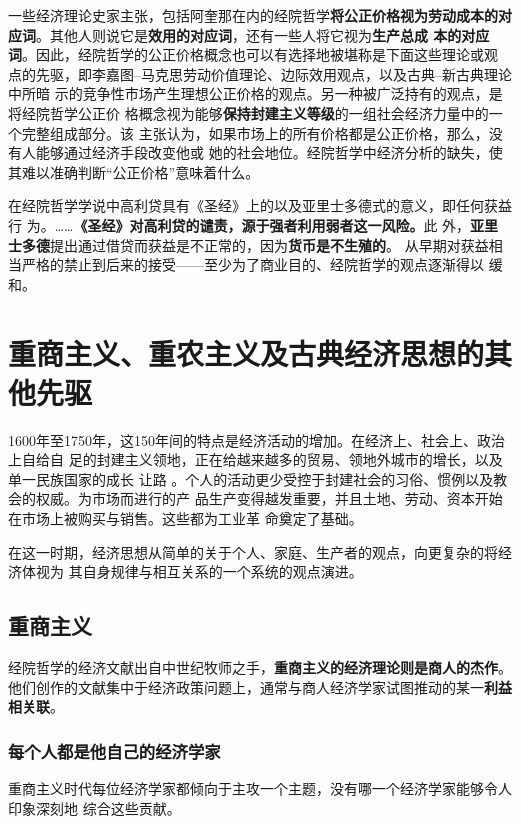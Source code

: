 一些经济理论史家主张，包括阿奎那在内的经院哲学\textbf{将公正价格视为劳动成本的对
  应词}。其他人则说它是\textbf{效用的对应词}，还有一些人将它视为\textbf{生产总成
  本的对应词}。因此，经院哲学的公正价格概念也可以有选择地被堪称是下面这些理论或观
点的先驱，即李嘉图--马克思劳动价值理论、边际效用观点，以及古典--新古典理论中所暗
示的竞争性市场产生理想公正价格的观点。另一种被广泛持有的观点，是将经院哲学公正价
格概念视为能够\textbf{保持封建主义等级}的一组社会经济力量中的一个完整组成部分。该
主张认为，如果市场上的所有价格都是公正价格，那么，没有人能够通过经济手段改变他或
她的社会地位。经院哲学中经济分析的缺失，使其难以准确判断“公正价格”意味着什么。

在经院哲学学说中高利贷具有《圣经》上的以及亚里士多德式的意义，即任何获益行
为。……\textbf{《圣经》对高利贷的谴责，源于强者利用弱者这一风险。}此
外，\textbf{亚里士多德}提出通过借贷而获益是不正常的，因为\textbf{货币是不生殖的}。
从早期对获益相当严格的禁止到后来的接受——至少为了商业目的、经院哲学的观点逐渐得以
缓和。

\chapter{重商主义、重农主义及古典经济思想的其他先驱}

1600年至1750年，这150年间的特点是经济活动的增加。在经济上、社会上、政治上自给自
足的封建主义领地，正在给越来越多的贸易、领地外城市的增长，以及单一民族国家的成长
让路 。个人的活动更少受控于封建社会的习俗、惯例以及教会的权威。为市场而进行的产
品生产变得越发重要，并且土地、劳动、资本开始在市场上被购买与销售。这些都为工业革
命奠定了基础。

在这一时期，经济思想从简单的关于个人、家庭、生产者的观点，向更复杂的将经济体视为
其自身规律与相互关系的一个系统的观点演进。

\section{重商主义}

经院哲学的经济文献出自中世纪牧师之手，\textbf{重商主义的经济理论则是商人的杰作}。
他们创作的文献集中于经济政策问题上，通常与商人经济学家试图推动的某一\textbf{利益
  相关联}。

\subsection{每个人都是他自己的经济学家}

重商主义时代每位经济学家都倾向于主攻一个主题，没有哪一个经济学家能够令人印象深刻地
综合这些贡献。

